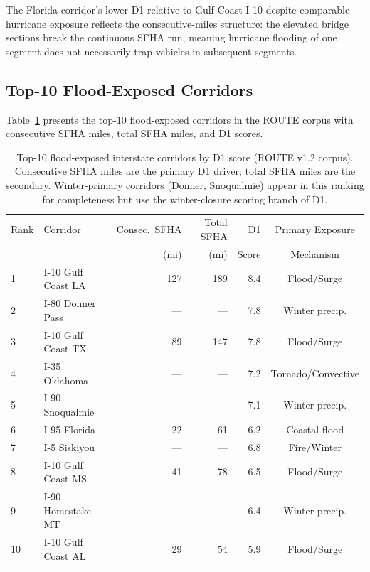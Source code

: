 The Florida corridor's lower D1 relative to Gulf Coast I-10 despite comparable hurricane
exposure reflects the consecutive-miles structure: the elevated bridge sections break the
continuous SFHA run, meaning hurricane flooding of one segment does not necessarily trap
vehicles in subsequent segments.

\subsection{Top-10 Flood-Exposed Corridors}

Table~\ref{tab:flood-top10} presents the top-10 flood-exposed corridors in the ROUTE corpus
with consecutive SFHA miles, total SFHA miles, and D1 scores.

\begin{table}[ht]
\centering
\caption{Top-10 flood-exposed interstate corridors by D1 score (ROUTE v1.2 corpus).
Consecutive SFHA miles are the primary D1 driver; total SFHA miles are the secondary.
Winter-primary corridors (Donner, Snoqualmie) appear in this ranking for completeness
but use the winter-closure scoring branch of D1.}
\label{tab:flood-top10}
\begin{tabular}{@{}llrrrc@{}}
\toprule
Rank & Corridor & Consec.\ SFHA & Total SFHA & D1 & Primary Exposure \\
     &          & (mi) & (mi) & Score & Mechanism \\
\midrule
1 & I-10 Gulf Coast LA     & 127 & 189 & 8.4 & Flood/Surge \\
2 & I-80 Donner Pass       & ---  & ---  & 7.8 & Winter precip. \\
3 & I-10 Gulf Coast TX     &  89  & 147 & 7.8 & Flood/Surge \\
4 & I-35 Oklahoma          & ---  & ---  & 7.2 & Tornado/Convective \\
5 & I-90 Snoqualmie        & ---  & ---  & 7.1 & Winter precip. \\
6 & I-95 Florida           &  22  &  61  & 6.2 & Coastal flood \\
7 & I-5 Siskiyou           & ---  & ---  & 6.8 & Fire/Winter \\
8 & I-10 Gulf Coast MS     &  41  &  78  & 6.5 & Flood/Surge \\
9 & I-90 Homestake MT      & ---  & ---  & 6.4 & Winter precip. \\
10 & I-10 Gulf Coast AL    &  29  &  54  & 5.9 & Flood/Surge \\
\bottomrule
\end{tabular}
\end{table}


